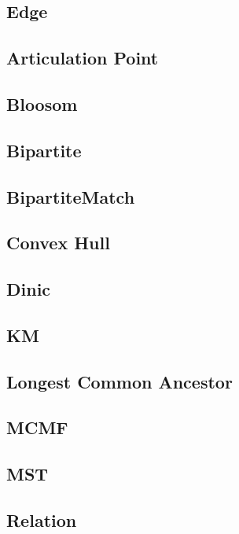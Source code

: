 \subsection{Edge}

\subsection{Articulation Point}

\subsection{Bloosom}

\subsection{Bipartite}

\subsection{BipartiteMatch}

\subsection{Convex Hull}

\subsection{Dinic}

\subsection{KM}

\subsection{Longest Common Ancestor}

\subsection{MCMF}

\subsection{MST}

\subsection{Relation}

